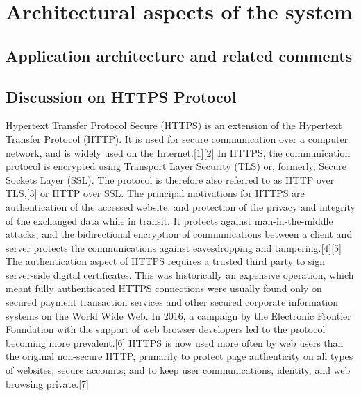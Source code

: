 \chapter{Architectural aspects of the system}\label{ch:architectural-aspects-of-the-system}


\section{Application architecture and related comments}\label{sec:application-architecture-and-related-comments}




\section{Discussion on HTTPS Protocol}\label{sec:discussion-on-https-protocol}
Hypertext Transfer Protocol Secure (HTTPS) is an extension of the Hypertext Transfer Protocol (HTTP).
It is used for secure communication over a computer network, and is widely used on the Internet.[1][2]
In HTTPS, the communication protocol is encrypted using Transport Layer Security (TLS) or, formerly, Secure Sockets Layer (SSL).
The protocol is therefore also referred to as HTTP over TLS,[3] or HTTP over SSL\@.
The principal motivations for HTTPS are authentication of the accessed website, and protection of the privacy and integrity
of the exchanged data while in transit.
It protects against man-in-the-middle attacks, and the bidirectional encryption of communications between a client and
server protects the communications against eavesdropping and tampering.[4][5]
The authentication aspect of HTTPS requires a trusted third party to sign server-side digital certificates.
This was historically an expensive operation, which meant fully authenticated HTTPS connections were usually found only
on secured payment transaction services and other secured corporate information systems on the World Wide Web.
In 2016, a campaign by the Electronic Frontier Foundation with the support of web browser developers led to the protocol
becoming more prevalent.[6] HTTPS is now used more often by web users than the original non-secure HTTP, primarily to protect
page authenticity on all types of websites;
secure accounts;
and to keep user communications, identity, and web browsing private.[7]


